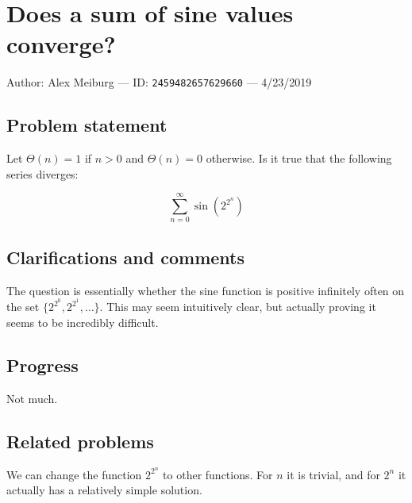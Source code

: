 
\section{Does a sum of sine values converge?}

Author: Alex Meiburg --- ID: \verb`2459482657629660` --- 4/23/2019

\subsection{Problem statement}

Let $\Theta(n)=1$ if $n>0$ and $\Theta(n)=0$ otherwise. Is it true that the following series diverges:

$$\sum_{n=0}^\infty\sin(2^{2^n})$$

\subsection{Clarifications and comments}

The question is essentially whether the sine function is positive infinitely often on the set $\{2^{2^0},2^{2^1},\ldots\}$. This may seem intuitively clear, but actually proving it seems to be incredibly difficult.

\subsection{Progress}

Not much.

\subsection{Related problems}

We can change the function $2^{2^n}$ to other functions. For $n$ it is trivial, and for $2^n$ it actually has a relatively simple solution.

